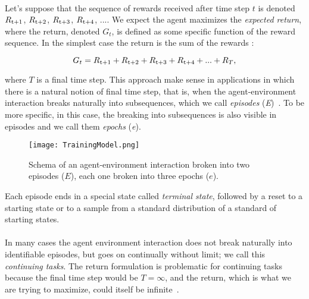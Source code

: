 \paragraph{}Let's suppose that the sequence of rewards received after time step $t$ is denoted $R\textsubscript{t+1}$, $R\textsubscript{t+2}$, $R\textsubscript{t+3}$, $R\textsubscript{t+4}$, $...$. We expect the agent maximizes the \textit{expected return}, where the return, denoted $G_t$, is defined as some specific function of the reward sequence. In the simplest case the return is the sum of the rewards :

\begin{equation}
  G_t = R\textsubscript{t+1} + R\textsubscript{t+2} + R\textsubscript{t+3} + R\textsubscript{t+4} + ... + R_T, 
\end{equation}

where $T$ is a final time step. This approach make sense in  applications in which there is a natural notion of final time step, that is, when the agent-environment interaction breaks naturally into subsequences, which we call \textit{episodes} (\textit{E})~\cite{SuttonBarto}. To be more specific, in this case, the breaking into subsequences is also visible in episodes and we call them \textit{epochs} (\textit{e}). 

\begin{center}
  \begin{figure}[h!]
  \texttt{[image: TrainingModel.png]}
    \caption{Schema of an agent-environment interaction broken into two episodes ($E$), each one broken into three epochs ($e$).}
    \label{fig:MDPS}
  \end{figure}
\end{center}

Each episode ends in a special state called \textit{terminal state}, followed by a reset to a starting state or to a sample from a standard distribution of a standard of starting states.

\paragraph{} In many cases the agent environment interaction does not break naturally into identifiable episodes, but goes on continually without limit; we call this \textit{continuing tasks}. The return formulation is problematic for continuing tasks because the final time step would be $T = \infty$, and the return, which is what we are trying to maximize, could itself be infinite~\cite{SuttonBarto}.

